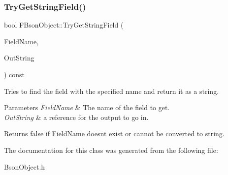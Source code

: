\subsubsection{\texorpdfstring{Try\+Get\+String\+Field()}{TryGetStringField()}}
{\footnotesize\ttfamily bool F\+Bson\+Object\+::\+Try\+Get\+String\+Field (\begin{DoxyParamCaption}\item[{const F\+String \&}]{Field\+Name,  }\item[{F\+String \&}]{Out\+String }\end{DoxyParamCaption}) const}

Tries to find the field with the specified name and return it as a string.


\begin{DoxyParams}{Parameters}
{\em Field\+Name} & The name of the field to get. \\
\hline
{\em Out\+String} & a reference for the output to go in. \\
\hline
\end{DoxyParams}
\begin{DoxyReturn}{Returns}
false if Field\+Name doesn\textquotesingle{}t exist or cannot be converted to string. 
\end{DoxyReturn}


The documentation for this class was generated from the following file\+:\begin{DoxyCompactItemize}
\item 
Bson\+Object.\+h\end{DoxyCompactItemize}
